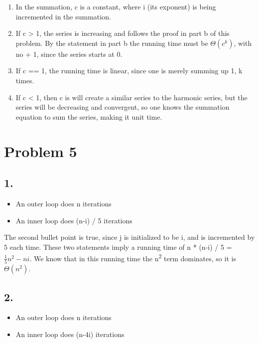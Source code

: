 \documentclass[]{article}
\providecommand{\tightlist}{%
  \setlength{\itemsep}{0pt}\setlength{\parskip}{0pt}}
\begin{document}
\begin{enumerate}
\def\labelenumi{\arabic{enumi}.}
\tightlist
\item
  In the summation, c is a constant, where i (its exponent) is being
  incremented in the summation.
\item
  If c \textgreater{} 1, the series is increasing and follows the proof
  in part b of this problem. By the statement in part b the running time
  must be \(\Theta(c^k)\), with no + 1, since the series starts at 0.
\item
  If c == 1, the running time is linear, since one is merely summing up
  1, k times.
\item
  If c \textless{} 1, then c is will create a similar series to the
  harmonic series, but the series will be decreasing and convergent, so
  one knows the summation equation to sum the series, making it unit
  time.
\end{enumerate}

\pagebreak

\section{Problem 5}\label{problem-5}

\subsection{1.}\label{section}

\begin{itemize}
\tightlist
\item
  An outer loop does n iterations
\item
  An inner loop does (n-i) / 5 iterations
\end{itemize}

The second bullet point is true, since j is initialized to be i, and is
incremented by 5 each time. These two statements imply a running time of
n * (n-i) / 5 = \(\frac15n^2-ni\). We know that in this running time the
n\textsuperscript{2} term dominates, so it is \(\Theta(n^2)\).

\pagebreak

\subsection{2.}\label{section-1}

\begin{itemize}
\tightlist
\item
  An outer loop does n iterations
\item
  An inner loop does (n-4i) iterations
\end{itemize}
\end{document}
